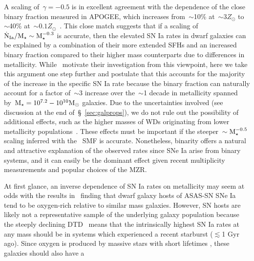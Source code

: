 \documentclass[foo.tex]{subfiles}
\begin{document}
A scaling of~$\gamma = -0.5$ is in excellent agreement with the dependence of
the close binary fraction measured in APOGEE, which increases from~$\sim$10\%
at~$\sim$$3Z_\odot$ to~$\sim$40\% at~$\sim$$0.1Z_\odot$~\citep{Moe2019}.
This close match suggests that if a scaling of
$\dot{\text{N}}_\text{Ia} / \text{M}_\star \sim \text{M}_\star^{-0.3}$ is accurate, then the
elevated SN Ia rates in dwarf galaxies can be explained by a combination of
their more extended SFHs and an increased binary fraction compared to their
higher mass counterparts due to differences in metallicity.
While~\citet{Gandhi2022} motivate their investigation from this viewpoint, here
we take this argument one step further and postulate that this accounts for
{\color{red} the majority of the}
increase in the specific SN Ia rate because the binary
fraction can naturally account for a factor of~$\sim$3 increase over
the~$\sim$1 decade in metallicity spanned by~$\text{M}_\star = 10^{7.2} - 10^{10}
\text{M}_\odot$ galaxies.
{\color{red}
Due to the uncertainties involved (see discussion at the end
of~\S~\ref{sec:galprops}), we do not rule out the possibility of additional
effects, such as the higher masses of WDs originating from lower metallicity
populations~\citep{Kistler2013}.
These effects must be important if the steeper~$\sim
\text{M}_\star^{-0.5}$ scaling inferred with the~\citet{Bell2003} SMF is accurate.
Nonetheless, binarity offers a natural and attractive explanation of the
observed rates since SNe Ia arise from binary systems, and it can easily be the
dominant effect given recent multiplicity measurements and popular choices of
the MZR.
}
\par
At first glance, an inverse dependence of SN Ia rates on metallicity may seem
at odds with the results in~\citet{Holoien2022} finding that dwarf galaxy
hosts of ASAS-SN SNe Ia tend to be oxygen-rich relative to similar mass
galaxies.
However, SN hosts are likely not a representative sample of the underlying
galaxy population because the steeply declining DTD~\citep[e.g.,][]{Maoz2012a}
means that the intrinsically highest SN Ia rates at any mass should be in
systems which experienced a recent starburst ($\lesssim$1 Gyr ago).
Since oxygen is produced by massive stars with short lifetimes
\citep*[e.g.,][]{Hurley2000, Johnson2019}, these galaxies should also have a
\end{document}
